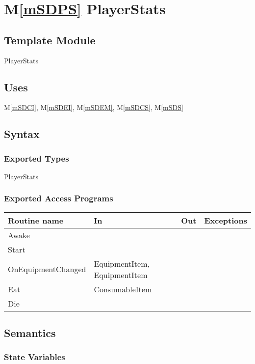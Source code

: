 \documentclass[12pt]{article}
\newcommand{\mref}[1]{M\ref{#1}}
\begin{document}
\newpage

\section* {\mref{mSDPS} PlayerStats}

\subsection*{Template Module}

PlayerStats

\subsection* {Uses}

\mref{mSDCI}, \mref{mSDEI}, \mref{mSDEM}, \mref{mSDCS}, \mref{mSDS}

\subsection* {Syntax}

\subsubsection* {Exported Types}

PlayerStats

\subsubsection* {Exported Access Programs}

\begin{tabular}{| l | l | l | l |}
\hline
\textbf{Routine name} & \textbf{In} & \textbf{Out} & \textbf{Exceptions}\\
\hline
Awake & ~ & ~  & ~\\
Start & ~  & ~ & ~\\
OnEquipmentChanged & EquipmentItem, EquipmentItem  & ~ & ~\\
Eat & ConsumableItem  & ~ & ~\\
Die & ~  & ~ & ~\\
\hline
\end{tabular}

\subsection* {Semantics}

\subsubsection* {State Variables}
\end{document}
